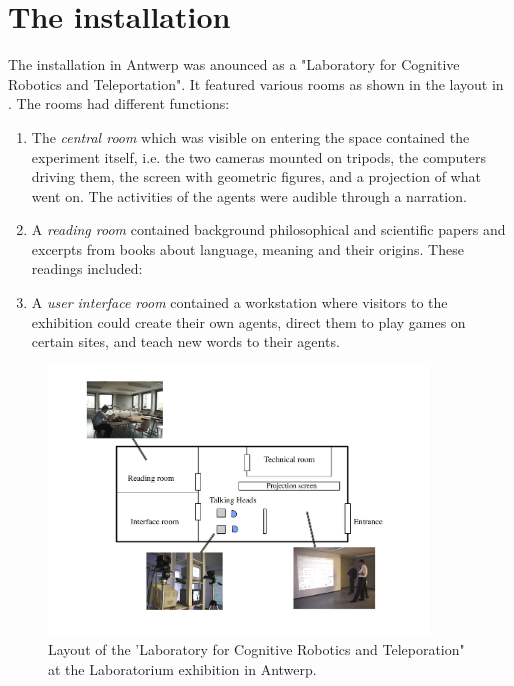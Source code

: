 \section{The installation}

The installation in Antwerp was anounced as a "Laboratory for Cognitive Robotics and Teleportation".\cite{Steels:99b}
It featured various rooms as shown in the layout in . The rooms had different functions: 
\begin{enumerate} 
\item The {\itshape central room} which was visible on entering the space contained the experiment itself, i.e. the 
two cameras mounted on tripods, the computers driving them, the screen with geometric figures, and a projection of 
what went on. The activities of the agents were audible through a narration. 
\item A {\itshape reading room} contained background philosophical and scientific 
papers and excerpts from books about language, meaning and their origins. These readings included: 
\item A {\itshape user interface room} contained a workstation where visitors to the exhibition could create their own 
agents, direct them to play games on certain sites, and teach new words to their agents. 
\end{enumerate}

\begin{figure}[htbp]
  \centerline{\includegraphics[width=0.9\textwidth]{chap8/figures/layout}}
\caption{\label{fig:layout} 
Layout of the 'Laboratory for Cognitive Robotics and Teleporation" at the Laboratorium exhibition in Antwerp.}
\end{figure}


